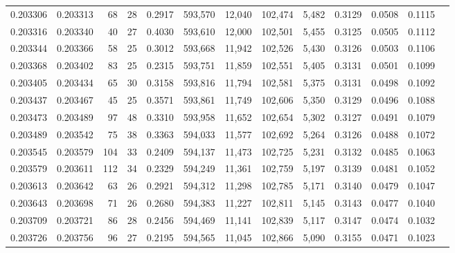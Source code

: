 \begin{tabular}{rrrrrrrrrrrrr}
0.203306 & 0.203313 &    68 &  28 &                                     0.2917 & 593,570 &  12,040 & 102,474 &   5,482 & 0.3129 & 0.0508 & 0.1115 \\
0.203316 & 0.203340 &    40 &  27 &                                     0.4030 & 593,610 &  12,000 & 102,501 &   5,455 & 0.3125 & 0.0505 & 0.1112 \\
0.203344 & 0.203366 &    58 &  25 &                                     0.3012 & 593,668 &  11,942 & 102,526 &   5,430 & 0.3126 & 0.0503 & 0.1106 \\
0.203368 & 0.203402 &    83 &  25 &                                     0.2315 & 593,751 &  11,859 & 102,551 &   5,405 & 0.3131 & 0.0501 & 0.1099 \\
0.203405 & 0.203434 &    65 &  30 &                                     0.3158 & 593,816 &  11,794 & 102,581 &   5,375 & 0.3131 & 0.0498 & 0.1092 \\
0.203437 & 0.203467 &    45 &  25 &                                     0.3571 & 593,861 &  11,749 & 102,606 &   5,350 & 0.3129 & 0.0496 & 0.1088 \\
0.203473 & 0.203489 &    97 &  48 &                                     0.3310 & 593,958 &  11,652 & 102,654 &   5,302 & 0.3127 & 0.0491 & 0.1079 \\
0.203489 & 0.203542 &    75 &  38 &                                     0.3363 & 594,033 &  11,577 & 102,692 &   5,264 & 0.3126 & 0.0488 & 0.1072 \\
0.203545 & 0.203579 &   104 &  33 &                                     0.2409 & 594,137 &  11,473 & 102,725 &   5,231 & 0.3132 & 0.0485 & 0.1063 \\
0.203579 & 0.203611 &   112 &  34 &                                     0.2329 & 594,249 &  11,361 & 102,759 &   5,197 & 0.3139 & 0.0481 & 0.1052 \\
0.203613 & 0.203642 &    63 &  26 &                                     0.2921 & 594,312 &  11,298 & 102,785 &   5,171 & 0.3140 & 0.0479 & 0.1047 \\
0.203643 & 0.203698 &    71 &  26 &                                     0.2680 & 594,383 &  11,227 & 102,811 &   5,145 & 0.3143 & 0.0477 & 0.1040 \\
0.203709 & 0.203721 &    86 &  28 &                                     0.2456 & 594,469 &  11,141 & 102,839 &   5,117 & 0.3147 & 0.0474 & 0.1032 \\
0.203726 & 0.203756 &    96 &  27 &                                     0.2195 & 594,565 &  11,045 & 102,866 &   5,090 & 0.3155 & 0.0471 & 0.1023 \\

\end{tabular}
